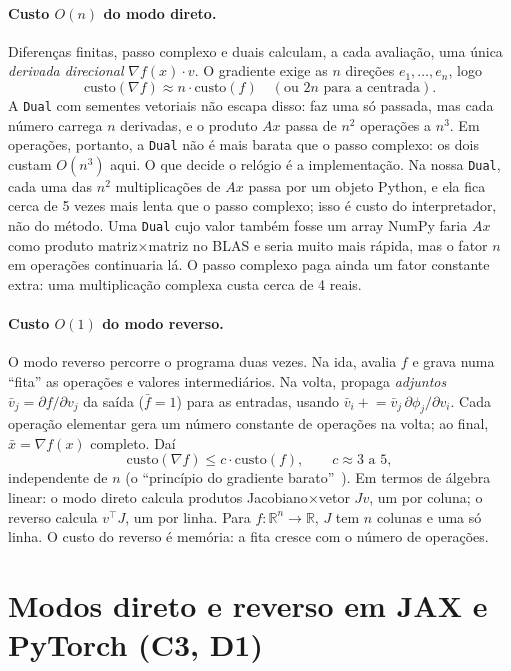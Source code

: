 \documentclass[11pt,a4paper]{article}
\begin{document}
\paragraph{Custo $O(n)$ do modo direto.} Diferenças finitas, passo complexo e duais calculam, a cada avaliação, uma única \emph{derivada direcional} $\nabla f(x)\cdot v$. O gradiente exige as $n$ direções $e_1,\dots,e_n$, logo
\[
\text{custo}(\nabla f) \approx n\cdot \text{custo}(f)\quad(\text{ou }2n\text{ para a centrada}).
\]
A \texttt{Dual} com sementes vetoriais não escapa disso: faz uma só passada, mas cada número carrega $n$ derivadas, e o produto $Ax$ passa de $n^2$ operações a $n^3$. Em operações, portanto, a \texttt{Dual} não é mais barata que o passo complexo: os dois custam $O(n^3)$ aqui. O que decide o relógio é a implementação. Na nossa \texttt{Dual}, cada uma das $n^2$ multiplicações de $Ax$ passa por um objeto Python, e ela fica cerca de 5 vezes mais lenta que o passo complexo; isso é custo do interpretador, não do método. Uma \texttt{Dual} cujo valor também fosse um array NumPy faria $Ax$ como produto matriz$\times$matriz no BLAS e seria muito mais rápida, mas o fator $n$ em operações continuaria lá. O passo complexo paga ainda um fator constante extra: uma multiplicação complexa custa cerca de 4 reais.

\paragraph{Custo $O(1)$ do modo reverso.} O modo reverso percorre o programa duas vezes. Na ida, avalia $f$ e grava numa ``fita'' as operações e valores intermediários. Na volta, propaga \emph{adjuntos} $\bar v_j=\partial f/\partial v_j$ da saída ($\bar f=1$) para as entradas, usando $\bar v_i \mathrel{+}= \bar v_j\,\partial\phi_j/\partial v_i$. Cada operação elementar gera um número constante de operações na volta; ao final, $\bar x = \nabla f(x)$ completo. Daí
\[
\text{custo}(\nabla f)\le c\cdot\text{custo}(f),\qquad c\approx 3\text{ a }5,
\]
independente de $n$ (o ``princípio do gradiente barato''~\cite{baydin2018,griewank2008}). Em termos de álgebra linear: o modo direto calcula produtos Jacobiano$\times$vetor $J v$, um por coluna; o reverso calcula $v^\top J$, um por linha. Para $f:\mathbb{R}^n\to\mathbb{R}$, $J$ tem $n$ colunas e uma só linha. O custo do reverso é memória: a fita cresce com o número de operações.

\section{Modos direto e reverso em JAX e PyTorch (C3, D1)}
\end{document}
